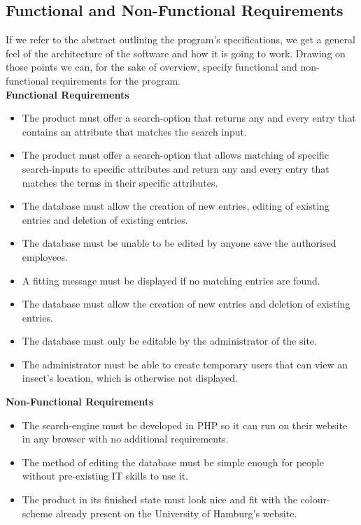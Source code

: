 \documentclass[12pt,a4paper]{article}
\begin{document}
\subsection{Functional and Non-Functional Requirements}

If we refer to the abstract outlining the program's specifications, we get a general feel of the architecture of the software and how it is going to work. Drawing on those points we can, for the sake of overview, specify functional and non-functional requirements for the program.\\

{\bf Functional Requirements}
\begin{itemize}
	\item The product must offer a search-option that returns any and every entry that contains an attribute that matches the search input.
	\item The product must offer a search-option that allows matching of specific search-inputs to specific attributes and return any and every entry that matches the terms in their specific attributes.
	\item The database must allow the creation of new entries, editing of existing entries and deletion of existing entries.
	\item The database must be unable to be edited by anyone save the authorised employees.
	\item A fitting message must be displayed if no matching entries are found.
	\item The database must allow the creation of new entries and deletion of existing entries.
	\item The database must only be editable by the administrator of the site.
	\item The administrator must be able to create temporary users that can view an insect's location, which is otherwise not displayed.\\
\end{itemize}
{\bf Non-Functional Requirements}
\begin{itemize}
	\item The search-engine must be developed in PHP so it can run on their website in any browser with no additional requirements.
	\item The method of editing the database must be simple enough for people without pre-existing IT skills to use it.
	\item The product in its finished state must look nice and fit with the colour-scheme already present on the University of Hamburg's website.
\end{itemize}
\newpage
\end{document}
